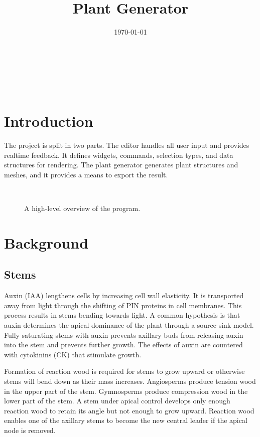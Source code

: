 \documentclass[10pt]{article}
\title{Plant Generator}
\date{\today}
\begin{document}
\begin{center}
  \\
 \vspace{1em}
 \begin{huge} \@title \end{huge} \\
 \vspace{1em}
 \@date
\end{center}
\tableofcontents
\pagebreak

\section{Introduction}
The project is split in two parts. The editor handles all user input and provides realtime feedback. It defines widgets, commands, selection types, and data structures for rendering. The plant generator generates plant structures and meshes, and it provides a means to export the result.
\begin{figure}[H]
\centering
 \\
\caption{A high-level overview of the program.}
\end{figure}

\section{Background}
\subsection{Stems}
Auxin (IAA) lengthens cells by increasing cell wall elasticity. It is transported away from light through the shifting of PIN proteins in cell membranes. This process results in stems bending towards light. A common hypothesis is that auxin determines the apical dominance of the plant through a source-sink model. Fully saturating stems with auxin prevents axillary buds from releasing auxin into the stem and prevents further growth. The effects of auxin are countered with cytokinins (CK) that stimulate growth.

Formation of reaction wood is required for stems to grow upward or otherwise stems will bend down as their mass increases. Angiosperms produce tension wood in the upper part of the stem. Gymnosperms produce compression wood in the lower part of the stem. A stem under apical control develops only enough reaction wood to retain its angle but not enough to grow upward. Reaction wood enables one of the axillary stems to become the new central leader if the apical node is removed.
\end{document}
